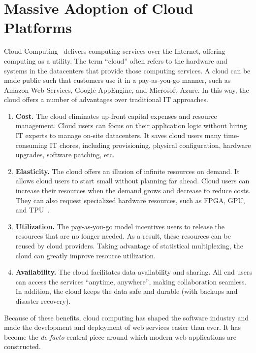 \section{Massive Adoption of Cloud Platforms}
\label{sec:cloud}

Cloud Computing~\cite{armbrust2010view} delivers computing services over the
Internet, offering computing as a utility. The term ``cloud'' often refers to
the hardware and systems in the datacenters that provide those computing
services. A cloud can be made public such that customers use it in a
pay-as-you-go manner, such as Amazon Web Services, Google AppEngine, and
Microsoft Azure. In this way, the cloud offers a number of advantages over
traditional IT approaches.

\begin{enumerate}
\item \textbf{Cost.} The cloud eliminates up-front capital expenses and resource
  management. Cloud users can focus on their application logic without hiring IT
  experts to manage on-site datacenters. It saves cloud users many
  time-consuming IT chores, including provisioning, physical configuration,
  hardware upgrades, software patching, etc.

\item \textbf{Elasticity.} The cloud offers an illusion of infinite resources on
  demand. It allows cloud users to start small without planning far ahead. Cloud
  users can increase their resources when the demand grows and decrease to
  reduce costs. They can also request specialized hardware resources, such as
  FPGA, GPU, and TPU~\cite{abadi2016tensorflow}.

\item \textbf{Utilization.} The pay-as-you-go model incentives users to release
  the resources that are no longer needed. As a result, these resources can be
  reused by cloud providers. Taking advantage of statistical multiplexing, the
  cloud can greatly improve resource utilization.

\item \textbf{Availability.} The cloud facilitates data availability and
  sharing. All end users can access the services ``anytime, anywhere'', making
  collaboration seamless. In addition, the cloud keeps the data safe and durable
  (with backups and disaster recovery).

\end{enumerate}

Because of these benefits, cloud computing has shaped the software industry and
made the development and deployment of web services easier than ever. It has
become the \textit{de facto} central piece around which modern web applications
are constructed.

